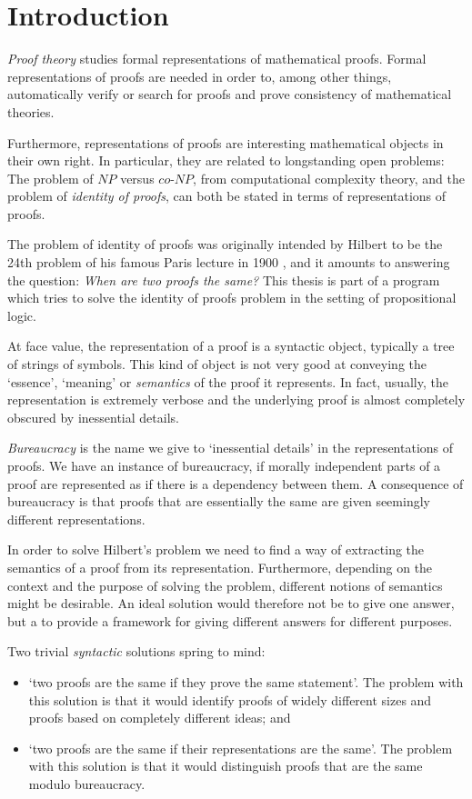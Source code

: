 \section{Introduction}

\emph{Proof theory} studies formal representations of mathematical proofs. Formal representations of proofs are needed in order to, among other things, automatically verify or search for proofs and prove consistency of mathematical theories.

Furthermore, representations of proofs are interesting mathematical objects in their own right. In particular, they are related to longstanding open problems: The problem of $NP$ versus $co$-$NP$, from computational complexity theory, and the problem of \emph{identity of proofs}, can both be stated in terms of representations of proofs.

The problem of identity of proofs was originally intended by Hilbert to be the 24th problem of his famous Paris lecture in 1900 \cite{Thie:03:Hilberts:yu}, and it amounts to answering the question: \emph{When are two proofs the same?} This thesis is part of a program which tries to solve the identity of proofs problem in the setting of propositional logic.

At face value, the representation of a proof is a syntactic object, typically a tree of strings of symbols. This kind of object is not very good at conveying the `essence', `meaning' or \emph{semantics} of the proof it represents. In fact, usually, the representation is extremely verbose and the underlying proof is almost completely obscured by inessential details.

\emph{Bureaucracy} is the name we give to `inessential details' in the representations of proofs. We have an instance of  bureaucracy, if morally independent parts of a proof are represented as if there is a dependency between them. A consequence of bureaucracy is that proofs that are essentially the same are given seemingly different representations.

In order to solve Hilbert's problem we need to find a way of extracting the semantics of a proof from its representation. Furthermore, depending on the context and the purpose of solving the problem, different notions of semantics might be desirable. An ideal solution would therefore not be to give one answer, but a to provide a framework for giving different answers for different purposes.

Two trivial \emph{syntactic} solutions spring to mind:
\begin{itemize}
 \item `two proofs are the same if they prove the same statement'. The problem with this solution is that it would identify proofs of widely different sizes and proofs based on completely different ideas; and
 \item `two proofs are the same if their representations are the same'. The problem with this solution is that it would distinguish proofs that are the same modulo bureaucracy.
\end{itemize}

